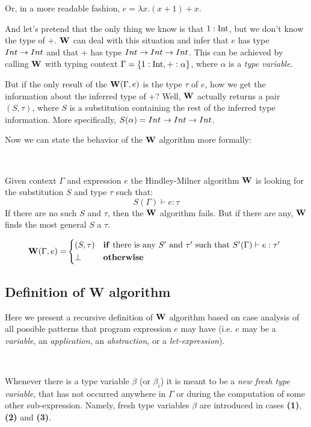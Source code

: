\documentclass[a4paper,oneside]{memoir}
\begin{document}
Or, in a more readable fashion, $e = \lambda x . (x+1)+x $.


And let's pretend that the only thing we know is that $1 : \operatorname{Int}$, 
but we don't know the type of $+$. 
$\operatorname{\textbf{W}}$ can deal with this situation and infer that $e$ has type $Int \rightarrow Int$ and
that $+$ has type $Int \rightarrow Int \rightarrow Int$. This can be achieved by calling $\operatorname{\textbf{W}}$ with
typing context $\Gamma = \{ 1 : \operatorname{Int}, + : \alpha \}$, 
where $\alpha$ is a \textit{type variable}.

But if the only result of the $\operatorname{\textbf{W}}(\Gamma,e)$ is the type $\tau$ of $e$, 
how we get the information about the inferred type of $+$? 
Well, $\operatorname{\textbf{W}}$ actually returns a pair $(S, \tau)$, where $S$ is a substitution
containing the rest of the inferred type information. 
More specifically, $S(\alpha) = Int \rightarrow Int \rightarrow Int$.  

Now we can state the behavior of the $\operatorname{\textbf{W}}$ algorithm more formally:

~

Given context $\Gamma$ and expression $e$ the Hindley-Milner algorithm $\operatorname{\textbf{W}}$ 
is looking for the substitution $S$ and type $\tau$ such that: 
$$ S(\Gamma) \vdash e : \tau $$
If there are no such $S$ and $\tau$, then the $\operatorname{\textbf{W}}$ algorithm fails.
But if there are any, $\operatorname{\textbf{W}}$ finds the most general $S$ a $\tau$.


\begin{align*}
\W(\Gamma, e) = &
\begin{cases*}
  (S, \tau) 
  & \textbf{if} there is any $\SPr$ and $\tauPr$ such that $S^\prime(\Gamma) \vdash e : \tauPr$  \\
  \bot & \textbf{otherwise}
\end{cases*}\\
\end{align*}




\subsection{Definition of W algorithm}

Here we present a recursive definition of $\operatorname{\textbf{W}}$ algorithm based on case analysis of all possible patterns that program expression $e$ may have 
(i.e. $e$ may be a \textit{variable}, an \textit{application}, an \textit{abstraction}, or a \textit{let-expression}). 

~

Whenever there is a type variable $\beta$ (or $\beta_i$) it is meant to be a \textit{new fresh type variable}, that has not occurred anywhere in $\Gamma$ or during the computation of some other sub-expression. Namely, fresh type variables $\beta$ are introduced in cases \textbf{(1)}, \textbf{(2)} and \textbf{(3)}. 
\end{document}
